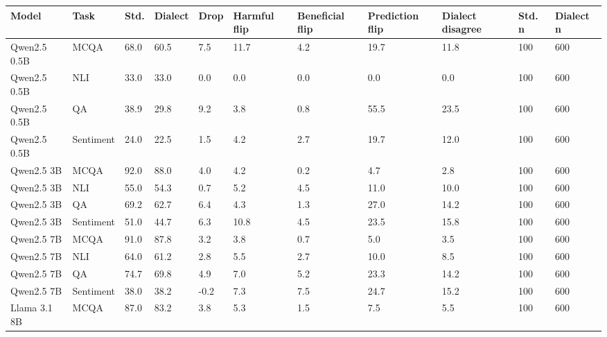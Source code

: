 \begin{tabular}{lllllllllll}
\toprule
       Model &      Task & Std. & Dialect & Drop & Harmful flip & Beneficial flip & Prediction flip & Dialect disagree & Std. n & Dialect n \\
\midrule
Qwen2.5 0.5B &      MCQA & 68.0 &    60.5 &  7.5 &         11.7 &             4.2 &            19.7 &             11.8 &    100 &       600 \\
Qwen2.5 0.5B &       NLI & 33.0 &    33.0 &  0.0 &          0.0 &             0.0 &             0.0 &              0.0 &    100 &       600 \\
Qwen2.5 0.5B &        QA & 38.9 &    29.8 &  9.2 &          3.8 &             0.8 &            55.5 &             23.5 &    100 &       600 \\
Qwen2.5 0.5B & Sentiment & 24.0 &    22.5 &  1.5 &          4.2 &             2.7 &            19.7 &             12.0 &    100 &       600 \\
  Qwen2.5 3B &      MCQA & 92.0 &    88.0 &  4.0 &          4.2 &             0.2 &             4.7 &              2.8 &    100 &       600 \\
  Qwen2.5 3B &       NLI & 55.0 &    54.3 &  0.7 &          5.2 &             4.5 &            11.0 &             10.0 &    100 &       600 \\
  Qwen2.5 3B &        QA & 69.2 &    62.7 &  6.4 &          4.3 &             1.3 &            27.0 &             14.2 &    100 &       600 \\
  Qwen2.5 3B & Sentiment & 51.0 &    44.7 &  6.3 &         10.8 &             4.5 &            23.5 &             15.8 &    100 &       600 \\
  Qwen2.5 7B &      MCQA & 91.0 &    87.8 &  3.2 &          3.8 &             0.7 &             5.0 &              3.5 &    100 &       600 \\
  Qwen2.5 7B &       NLI & 64.0 &    61.2 &  2.8 &          5.5 &             2.7 &            10.0 &              8.5 &    100 &       600 \\
  Qwen2.5 7B &        QA & 74.7 &    69.8 &  4.9 &          7.0 &             5.2 &            23.3 &             14.2 &    100 &       600 \\
  Qwen2.5 7B & Sentiment & 38.0 &    38.2 & -0.2 &          7.3 &             7.5 &            24.7 &             15.2 &    100 &       600 \\
Llama 3.1 8B &      MCQA & 87.0 &    83.2 &  3.8 &          5.3 &             1.5 &             7.5 &              5.5 &    100 &       600 \\

\end{tabular}
